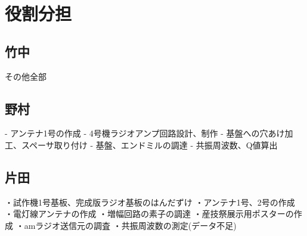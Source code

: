 \documentclass[report.tex]{subfiles}
\begin{document}
\section{役割分担}

\subsection{竹中}

その他全部

\subsection{野村}

- アンテナ1号の作成
- 4号機ラジオアンプ回路設計、制作
- 基盤への穴あけ加工、スペーサ取り付け
- 基盤、エンドミルの調達
- 共振周波数、Q値算出

\subsection{片田}

・試作機1号基板、完成版ラジオ基板のはんだずけ
・アンテナ1号、2号の作成
・電灯線アンテナの作成
・増幅回路の素子の調達
・産技祭展示用ポスターの作成
・amラジオ送信元の調査
・共振周波数の測定(データ不足)
\end{document}
